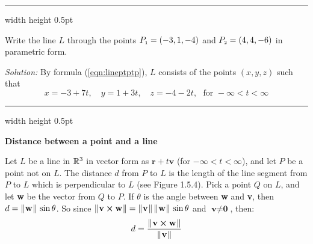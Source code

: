 \vspace{3mm}
\hrule width \textwidth height 0.5pt
\begin{exmp}\label{exmp:linethrupts}
 Write the line $L$ through the points $P_{\scriptscriptstyle 1} = (-3,1,-4)$ and $P_{\scriptscriptstyle 2} = (4,4,-6)$ in parametric
 form.\vspace{1mm}
 \par\noindent\emph{Solution:} By formula (\ref{eqn:lineptptp}), $L$ consists of the points $(x,y,z)$ such that
 \begin{displaymath}
  x = -3 + 7t, \quad y = 1 +3t, \quad z = -4 -2t, \text{~~for~} -\infty < t < \infty
 \end{displaymath}
\end{exmp}\vspace{-1mm}
\hrule width \textwidth height 0.5pt
\vspace{2mm}

\par\noindent\textbf{\large{Distance between a point and a line}}\normalsize\vspace{1.5mm}

\piccaption[]{}
Let $L$ be a line in $\mathbb{R}^{3}$ in vector form as $\textbf{r} + t \textbf{v}$ (for $-\infty < t < \infty$), and
let $P$ be a point not on $L$. The distance $d$ from $P$ to $L$ is the length
of the line segment from $P$ to $L$ which is perpendicular to $L$ (see Figure 1.5.4).
Pick a point $Q$ on $L$, and let \textbf{w} be the vector from $Q$ to $P$. If $\theta$ is the angle between \textbf{w}
and \textbf{v}, then $d = \lVert\mspace{1mu}\textbf{w}\mspace{1mu}\rVert\,\sin \theta$. So since
$\lVert\mspace{1mu}\textbf{v} \bm{\times} \textbf{w}\mspace{1mu}\rVert = \lVert\mspace{1mu}\textbf{v}\mspace{1mu}\rVert\,\lVert\mspace{1mu}\textbf{w}\mspace{1mu}\rVert\,\sin \theta$ and
$\textbf{v} \ne \textbf{0}$, then:
\begin{equation}\label{eqn:distptline}
 d = \frac{\lVert\mspace{1mu}\textbf{v} \bm{\times} \textbf{w}\mspace{1mu}\rVert}{\lVert\mspace{1mu}\textbf{v}\mspace{1mu}\rVert}
\end{equation}

